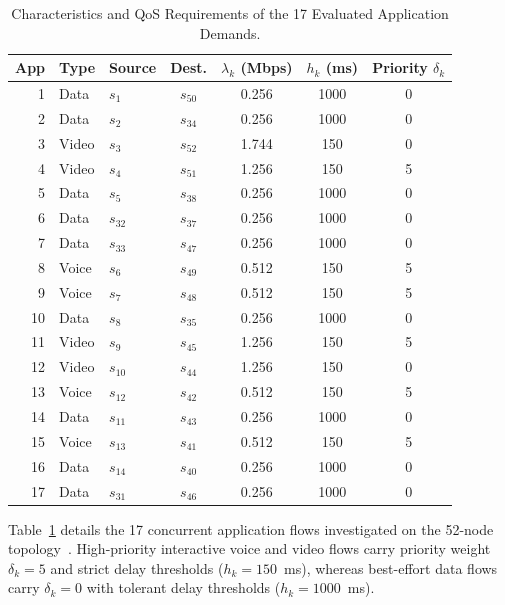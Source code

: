 \documentclass[journal]{IEEEtran}
\begin{document}
\begin{table}[!t]
\caption{Characteristics and QoS Requirements of the 17 Evaluated Application Demands.}
\label{tab:apps}
\centering
\footnotesize
\setlength{\tabcolsep}{3.2pt}
\renewcommand{\arraystretch}{1.1}
\begin{tabular}{@{}rllcccc@{}}
\toprule
\textbf{App} & \textbf{Type} & \textbf{Source} & \textbf{Dest.} & $\lambda_k$ (Mbps) & $h_k$ (ms) & Priority $\delta_k$ \\
\midrule
1  & Data  & $s_1$  & $s_{50}$ & 0.256 & 1000 & 0 \\
2  & Data  & $s_2$  & $s_{34}$ & 0.256 & 1000 & 0 \\
3  & Video & $s_3$  & $s_{52}$ & 1.744 & 150  & 0 \\
4  & Video & $s_4$  & $s_{51}$ & 1.256 & 150  & 5 \\
5  & Data  & $s_5$  & $s_{38}$ & 0.256 & 1000 & 0 \\
6  & Data  & $s_{32}$ & $s_{37}$ & 0.256 & 1000 & 0 \\
7  & Data  & $s_{33}$ & $s_{47}$ & 0.256 & 1000 & 0 \\
8  & Voice & $s_6$  & $s_{49}$ & 0.512 & 150  & 5 \\
9  & Voice & $s_7$  & $s_{48}$ & 0.512 & 150  & 5 \\
10 & Data  & $s_8$  & $s_{35}$ & 0.256 & 1000 & 0 \\
11 & Video & $s_9$  & $s_{45}$ & 1.256 & 150  & 5 \\
12 & Video & $s_{10}$ & $s_{44}$ & 1.256 & 150  & 0 \\
13 & Voice & $s_{12}$ & $s_{42}$ & 0.512 & 150  & 5 \\
14 & Data  & $s_{11}$ & $s_{43}$ & 0.256 & 1000 & 0 \\
15 & Voice & $s_{13}$ & $s_{41}$ & 0.512 & 150  & 5 \\
16 & Data  & $s_{14}$ & $s_{40}$ & 0.256 & 1000 & 0 \\
17 & Data  & $s_{31}$ & $s_{46}$ & 0.256 & 1000 & 0 \\
\bottomrule
\end{tabular}
\end{table}

Table~\ref{tab:apps} details the 17 concurrent application flows investigated on the 52-node topology~\cite{ladeia2018otimizacao}. High-priority interactive voice and video flows carry priority weight $\delta_k = 5$ and strict delay thresholds ($h_k = 150$~ms), whereas best-effort data flows carry $\delta_k = 0$ with tolerant delay thresholds ($h_k = 1000$~ms).
\end{document}
